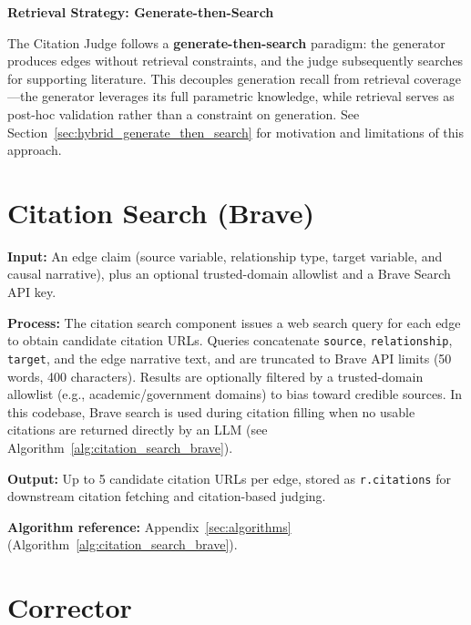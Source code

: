 \noindent\textbf{Retrieval Strategy: Generate-then-Search}
\label{sec:retrieval_strategy}

The Citation Judge follows a \textbf{generate-then-search} paradigm: the generator produces edges without retrieval constraints, and the judge subsequently searches for supporting literature. This decouples generation recall from retrieval coverage---the generator leverages its full parametric knowledge, while retrieval serves as post-hoc validation rather than a constraint on generation. See Section~\ref{sec:hybrid_generate_then_search} for motivation and limitations of this approach.

\section{Citation Search (Brave)}
\label{sec:citation_search}

\textbf{Input:} An edge claim (source variable, relationship type, target variable, and causal narrative), plus an optional trusted-domain allowlist and a Brave Search API key.

\textbf{Process:} The citation search component issues a web search query for each edge to obtain candidate citation URLs. Queries concatenate \texttt{source}, \texttt{relationship}, \texttt{target}, and the edge narrative text, and are truncated to Brave API limits (50 words, 400 characters). Results are optionally filtered by a trusted-domain allowlist (e.g., academic/government domains) to bias toward credible sources. In this codebase, Brave search is used during citation filling when no usable citations are returned directly by an LLM (see Algorithm~\ref{alg:citation_search_brave}).

\textbf{Output:} Up to 5 candidate citation URLs per edge, stored as \texttt{r.citations} for downstream citation fetching and citation-based judging.

\textbf{Algorithm reference:} Appendix~\ref{sec:algorithms} (Algorithm~\ref{alg:citation_search_brave}).

\section{Corrector}
\label{sec:corrector}

